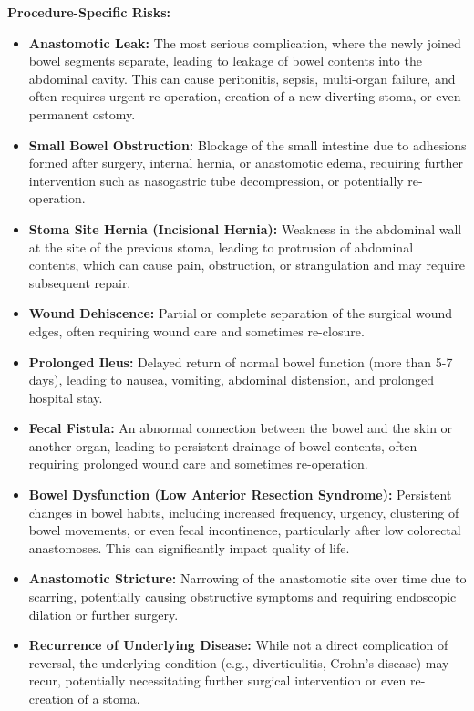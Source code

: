 \textbf{Procedure-Specific Risks:}
\begin{itemize}
  \item \textbf{Anastomotic Leak:} The most serious complication, where the newly joined bowel segments separate, leading to leakage of bowel contents into the abdominal cavity. This can cause peritonitis, sepsis, multi-organ failure, and often requires urgent re-operation, creation of a new diverting stoma, or even permanent ostomy.
  
  \item \textbf{Small Bowel Obstruction:} Blockage of the small intestine due to adhesions formed after surgery, internal hernia, or anastomotic edema, requiring further intervention such as nasogastric tube decompression, or potentially re-operation.
  
  \item \textbf{Stoma Site Hernia (Incisional Hernia):} Weakness in the abdominal wall at the site of the previous stoma, leading to protrusion of abdominal contents, which can cause pain, obstruction, or strangulation and may require subsequent repair.
  
  \item \textbf{Wound Dehiscence:} Partial or complete separation of the surgical wound edges, often requiring wound care and sometimes re-closure.
  
  \item \textbf{Prolonged Ileus:} Delayed return of normal bowel function (more than 5-7 days), leading to nausea, vomiting, abdominal distension, and prolonged hospital stay.
  
  \item \textbf{Fecal Fistula:} An abnormal connection between the bowel and the skin or another organ, leading to persistent drainage of bowel contents, often requiring prolonged wound care and sometimes re-operation.
  
  \item \textbf{Bowel Dysfunction (Low Anterior Resection Syndrome):} Persistent changes in bowel habits, including increased frequency, urgency, clustering of bowel movements, or even fecal incontinence, particularly after low colorectal anastomoses. This can significantly impact quality of life.
  
  \item \textbf{Anastomotic Stricture:} Narrowing of the anastomotic site over time due to scarring, potentially causing obstructive symptoms and requiring endoscopic dilation or further surgery.
  
  \item \textbf{Recurrence of Underlying Disease:} While not a direct complication of reversal, the underlying condition (e.g., diverticulitis, Crohn's disease) may recur, potentially necessitating further surgical intervention or even re-creation of a stoma.
\end{itemize}

